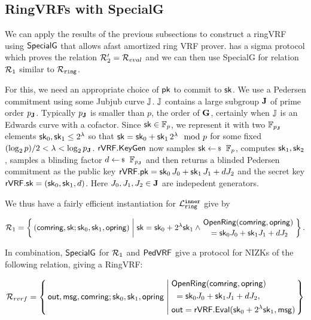 \subsection{RingVRFs with SpecialG}
\label{subsec:rvrf_faster}

We can apply the results of the previous subsections to construct a ringVRF using ${\mathsf{SpecialG}}$ that allows afast amortized ring VRF prover. \PedVRF has a sigma protocol which proves the relation $\mathcal{R}_2'=\mathcal{R}_{eval}$ and we can then use SpecialG for relation $\mathcal{R}_1$ similar to $\mathcal{R}_{\mathtt{ring}}$.

For this, we need an appropriate choice of $\mathsf{pk}$ to commit to $\mathsf{sk}$. We use a Pedersen commitment using some Jubjub curve ${\mathbb{J}}$. ${\mathbb{J}}$ contains a large subgroup ${\mathbf{J}}$ of prime order $p_{\mathbf{J}}$. Typically $p_{\mathbf{J}}$ is smaller than $p$, the order of ${\mathbf{G}}$, certainly when ${\mathbb{J}}$ is an Edwards curve with a cofactor. Since $\mathsf{sk} \in \mathbb{F}_p$, we represent it with two $\mathbb{F}_{p_{\mathbf{J}}}$ elements $\mathsf{sk}_0,\mathsf{sk}_1 \leq 2^{\lambda}$ 
so that $\mathsf{sk} = \mathsf{sk}_0 + \mathsf{sk}_1 \, 2^{\lambda} \mod p$ for some fixed $(\log_2 p)/2  < \lambda < \log_2 p_{\mathbf{J}}$. ${\mathsf{rVRF}}.{\mathsf{KeyGen}}$ now samples $\sk\leftsample \F_{p}$, computes $\mathsf{sk}_1,\mathsf{sk}_2$, samples a blinding factor $d \leftsample \F_{p_\grJ}$ and then returns a blinded Pedersen commitment as the public key ${\mathsf{rVRF}}.\mathsf{pk}=\mathsf{sk}_0\, J_0 + \mathsf{sk}_1\, J_1 + d J_2$ and the secret key ${\mathsf{rVRF}}.\mathsf{sk} = (\mathsf{sk}_0,\mathsf{sk}_1,d)$. Here $J_0,J_1,J_2 \in {\mathbf{J}}$ are indepedent generators.

We thus have a fairly efficient instantiation for $\mathcal{L}_{\mathtt{ring}}^{\mathtt{inner}}$ give by

$$ \relone = \Setst{ (\comring, \sk ; \sk_0, \sk_1,\openring) }{
  \sk = \sk_0+ 2^{\lambda} \sk_1 \wedge
 \genfrac{}{}{0pt}{}{ \eprint{\rVRF.}{}\OpenRing(\comring,\openring) }{ \,\, = \sk_0 \genJ_0 + \sk_1 \genJ_1 + d \genJ_2 }
} \mathperiod $$

In combination, ${\mathsf{SpecialG}}$ for $\mathcal{R}_1$ and ${\mathsf{PedVRF}}$ give a protocol for NIZKs of the following relation, giving a RingVRF:

$$ \rel_{rvrf} = \Setst{ \Out, \msg, \comring ; \sk_0,\sk_1,\openring }{
    \eprint{
        \eprint{\rVRF.}{}\OpenRing(\comring,\openring)    \textrm{ and }
        \,\, = \sk_0 \genJ_0 + \sk_1 \genJ_1 + d \genJ_2, \quad
        \Out = \rVRF.\Eval(\sk_0+ 2^{\lambda} \sk_1,\msg)
    }{
        \begin{aligned}
        & \eprint{\rVRF.}{}\OpenRing(\comring,\openring) \\
        & \,\, = \sk_0 \genJ_0 + \sk_1 \genJ_1 + d \genJ_2,\\
        & \Out = \rVRF.\Eval(\sk_0+ 2^{\lambda} \sk_1,\msg)
        \end{aligned}
    }
} $$

